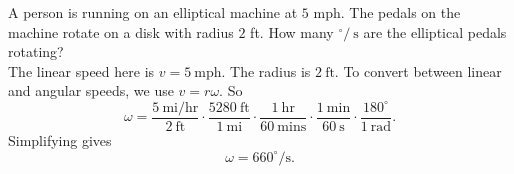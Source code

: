 A person is running on an elliptical machine at $5$ mph. The pedals on the machine rotate on a disk with radius $2$ ft. How many ${}^{\circ} /\ \text{s}$ are the elliptical pedals rotating?
\[\]
The linear speed here is $v = 5\ \text{mph}$. The radius is $2\ \text{ft}$. To convert between linear and angular speeds, we use $v = r\omega$. So
$$
  \omega = \frac{5\ \text{mi} / \text{hr}}{2\ \text{ft}} \cdot \frac{5280\ \text{ft}}{1\ \text{mi}} \cdot \frac{1\ \text{hr}}{60\ \text{mins}} \cdot \frac{1\ \text{min}}{60\ \text{s}} \cdot \frac{180^{\circ}}{1\ \text{rad}}.
$$
Simplifying gives
$$
  \omega = 660^{\circ}/\text{s}.
$$
